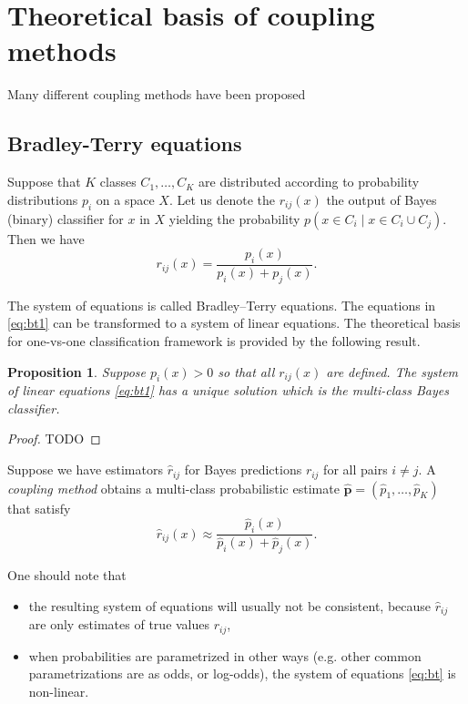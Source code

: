 \documentclass[twoside,11pt]{article}
\newtheorem{prop}{Proposition}
\begin{document}
\section{Theoretical basis of coupling methods}

Many different coupling methods have been proposed 


\subsection{Bradley-Terry equations}

Suppose that $K$ classes $C_1, \ldots, C_K$ are distributed according to probability distributions $p_i$ on a  space $X$. Let us denote the $r_{ij}(x)$ the output of Bayes (binary) classifier for $x$ in $X$ yielding the probability $p(x \in C_i \mid x\in C_i \cup C_j )$. Then we have
\begin{equation}
r_{ij}(x)= \frac {p_i(x)}{p_i(x) + p_j(x)}. \label{eq:bt1}
\end{equation}


The system of equations is called Bradley--Terry equations.  The equations in \eqref{eq:bt1}  can be transformed to a system of linear equations. The theoretical basis for one-vs-one classification framework is provided by the following result.

\begin{prop}
Suppose $p_i(x) >0$ so that all $r_{ij}(x)$ are defined. The system of linear equations \eqref{eq:bt1}  has a unique solution which is the multi-class Bayes classifier.
\end{prop}
\begin{proof}
TODO	
\end{proof}

Suppose we have estimators $\hat r_{ij}$ for Bayes predictions $r_{ij}$ for all pairs $i\not= j$. A \emph{coupling method} obtains a multi-class probabilistic estimate $\boldsymbol{\hat p}= (\hat p_1, \ldots, \hat p_K)$ that satisfy
\begin{equation}
	\hat{r}_{ij}(x) \approx \frac {\hat p_i(x)}{\hat p_i(x) + \hat p_j(x)}. \label{eq:bt2}
\end{equation}

 One should note that 
\begin{itemize}
\item the resulting system of equations will usually not be consistent, because $\hat{r}_{ij}$ are only estimates of true values $r_{ij}$,
\item when probabilities are parametrized in other ways (e.g. other common parametrizations are as odds, or log-odds), the system of equations \eqref{eq:bt} is non-linear.
\end{itemize}
\end{document}
